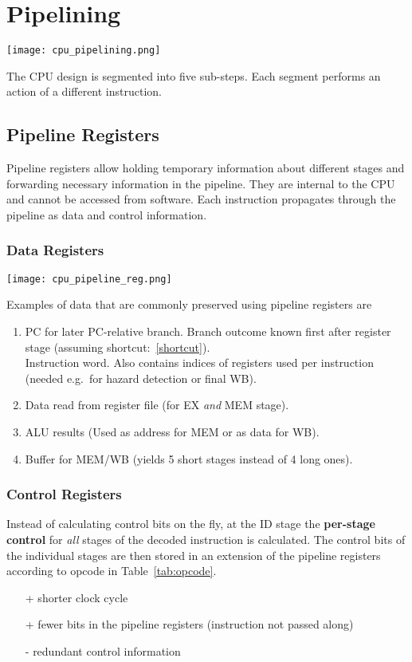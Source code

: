 \section{Pipelining}\label{pipelining}

\texttt{[image: cpu\_pipelining.png]}

The CPU design is segmented into five sub-steps. Each segment performs an action of a different instruction.

\subsection{Pipeline Registers}
Pipeline registers allow holding temporary information about different stages and forwarding necessary information in the pipeline. They are internal to the CPU and cannot be accessed from software. Each instruction propagates through the pipeline as data and control information.
\subsubsection{Data Registers}
\begin{center}
    \texttt{[image: cpu\_pipeline\_reg.png]}
\end{center}
Examples of data that are commonly preserved using pipeline registers are
\begin{enumerate}
    \item PC for later PC-relative branch. Branch outcome known first after register stage (assuming shortcut:~\ref{shortcut}).\\
    Instruction word. Also contains indices of registers used per instruction (needed e.g.\ for hazard detection or final WB).
    \item Data read from register file (for EX \textit{and} MEM stage).
    \item ALU results (Used as address for MEM or as data for WB).
    \item Buffer for MEM/WB (yields 5 short stages instead of 4 long ones).
\end{enumerate}

\subsubsection{Control Registers}
Instead of calculating control bits on the fly, at the ID stage the \textbf{per-stage control} for \textit{all} stages of the decoded instruction is calculated.
The control bits of the individual stages are then stored in an extension of the pipeline registers according to opcode in Table~\ref{tab:opcode}.
\begin{itemize}
    \item[+] shorter clock cycle
    \item[+] fewer bits in the pipeline registers (instruction not passed along)
    \item[-] redundant control information
\end{itemize}

